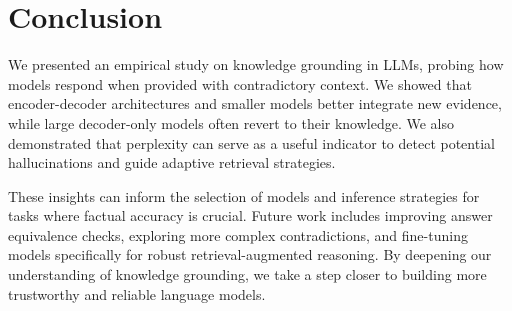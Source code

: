 \section{Conclusion}

We presented an empirical study on knowledge grounding in LLMs, probing how models respond when provided with contradictory context. We showed that encoder-decoder architectures and smaller models better integrate new evidence, while large decoder-only models often revert to their \Parametric{} knowledge. We also demonstrated that perplexity can serve as a useful indicator to detect potential hallucinations and guide adaptive retrieval strategies.

These insights can inform the selection of models and inference strategies for tasks where factual accuracy is crucial. Future work includes improving answer equivalence checks, exploring more complex contradictions, and fine-tuning models specifically for robust retrieval-augmented reasoning. By deepening our understanding of knowledge grounding, we take a step closer to building more trustworthy and reliable language models.
